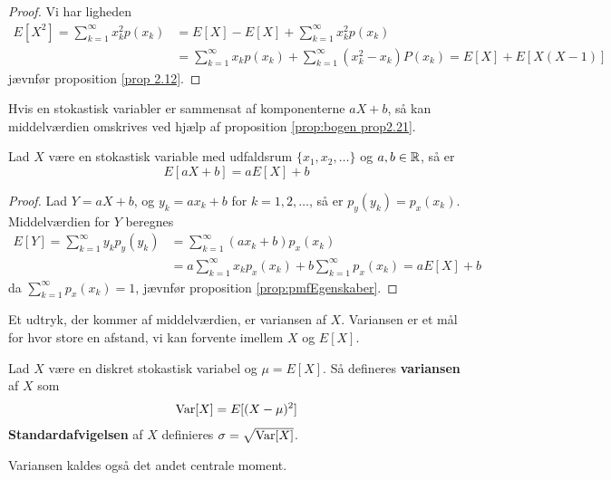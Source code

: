 \begin{proof}
Vi har ligheden
\begin{align*}
    E[X^2] = \sum^\infty_{k = 1} x_k^2 p(x_k) &= E[X] - E[X] + \sum^\infty_{k = 1} x_k^2 p(x_k) \\
    &= \sum^\infty_{k = 1} x_k p(x_k) + \sum^\infty_{k = 1} (x_k^2 - x_k)P(x_k) = E[X] + E[X(X - 1)]
\end{align*}
jævnfør proposition \ref{prop 2.12}.
\end{proof}
Hvis en stokastisk variabler er sammensat af komponenterne $aX+b$, så kan middelværdien omskrives ved hjælp af proposition \ref{prop:bogen prop2.21}.
\begin{prop} \label{prop:bogen prop2.21}
Lad $X$ være en stokastisk variable med udfaldsrum $\{x_1, x_2, \ldots\}$ og $a, b \in \mathbb{R}$, så er
\begin{equation*}
    E[aX+b] = aE[X] + b
\end{equation*}
\end{prop}
\begin{proof}
    Lad $Y = aX + b$, og $y_k = ax_k + b$ for $k = 1, 2, \ldots$, så er $p_y(y_k) = p_x(x_k)$. Middelværdien for $Y$ beregnes
    \begin{align*}
        E[Y] = \sum^\infty_{k = 1} y_k p_y(y_k) &= \sum^\infty_{k = 1} (a x_k + b) p_x(x_k) \\
        &= a \sum^\infty_{k = 1}  x_k p_x(x_k) + b \sum^\infty_{k = 1} p_x(x_k) = a E[X] + b
    \end{align*}
    da $\sum^\infty_{k = 1} p_x(x_k) = 1$, jævnfør proposition \ref{prop:pmfEgenskaber}.
\end{proof}
Et udtryk, der kommer af middelværdien, er variansen af $X$. Variansen er et mål for hvor store en afstand, vi kan forvente imellem $X$ og $E[X]$.

\begin{defn} \label{def:Varians}%
Lad $X$ være en diskret stokastisk variabel og $\mu = E[X]$. Så defineres \textbf{variansen} af $X$ som 
\begin{align*}
    \textnormal{Var}[ X ] = E[(X-\mu)^2]
\end{align*}
\textbf{Standardafvigelsen} af $X$ definieres $\sigma = \sqrt{\textnormal{Var}[ X ]}$.
\end{defn}

Variansen kaldes også det andet centrale moment.

